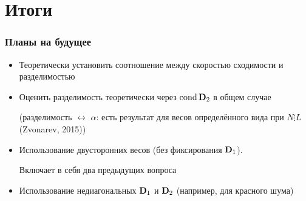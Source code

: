 \documentclass[unicode, notheorems]{beamer}
\DeclareMathOperator{\cond}{cond}
\begin{document}
\section{Итоги}

\begin{frame}
	\frametitle{Планы на будущее}
	\begin{itemize}
		\item Теоретически установить соотношение между скоростью сходимости и разделимостью
		\item Оценить разделимость теоретически через $\cond \bfD_2$ в общем случае
		
		(разделимость $\leftrightarrow$ $\alpha$: есть результат для весов определённого вида при $N \vdots L$ (Zvonarev, 2015))
		\item Использование двусторонних весов (без фиксирования $\mathbf{D}_1$).
		
		Включает в себя два предыдущих вопроса
		\item Использование недиагональных $\mathbf{D}_1$ и $\mathbf{D}_2$ (например, для красного шума)
	\end{itemize}
	
\end{frame}


\end{document}
